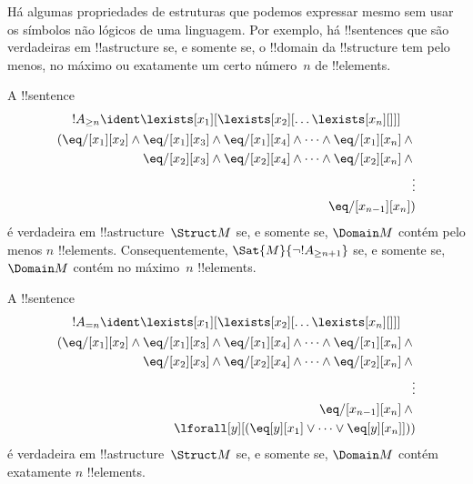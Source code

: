 \documentclass[../../../include/open-logic-section]{subfiles}
\begin{document}


\begin{explain}
Há algumas propriedades de estruturas que podemos expressar mesmo sem
usar os símbolos não lógicos de uma linguagem.  Por exemplo, há
!!{sentence}s que são verdadeiras em !!a{structure} se, e somente se, o
!!{domain} da !!{structure} tem pelo menos, no máximo ou exatamente um
certo número~$n$ de !!{element}s.
\end{explain}

\begin{prop}
A !!{sentence}
\begin{multline*}
  !A_{\ge n} \ident \lexists[x_1][\lexists[x_2][\dots\lexists[x_n][{}]]]\\
  \begin{aligned}
  (\eq/[x_1][x_2] \land {}
  \eq/[x_1][x_3] \land \eq/[x_1][x_4] \land \dots \land \eq/[x_1][x_n] \land {}\\
\eq/[x_2][x_3] \land \eq/[x_2][x_4] \land \dots \land {} \eq/[x_2][x_n] \land {} \\
\vdots\\
\eq/[x_{n-1}][x_n])
\end{aligned}
\end{multline*}
é verdadeira em !!a{structure}~$\Struct M$ se, e somente se, $\Domain M$
contém pelo menos $n$ !!{element}s. Consequentemente,
$\Sat{M}{\lnot !A_{\ge n+1}}$ se, e somente se, $\Domain M$ contém no
máximo~$n$ !!{element}s.

\end{prop}

\begin{prop}
A !!{sentence}
\begin{multline*}
!A_{= n} \ident \lexists[x_1][\lexists[x_2][\dots\lexists[x_n][{}]]] \\
\begin{aligned}
  (\eq/[x_1][x_2] \land {}
  \eq/[x_1][x_3] \land \eq/[x_1][x_4] \land \dots \land \eq/[x_1][x_n] \land {}\\
\eq/[x_2][x_3] \land \eq/[x_2][x_4] \land \dots \land {} \eq/[x_2][x_n] \land {} \\
\vdots\\
\eq/[x_{n-1}][x_n] \land {} \\
\lforall[y][(\eq[y][x_1] \lor \dots \lor \eq[y][x_n]]))
\end{aligned}
\end{multline*}
é verdadeira em !!a{structure}~$\Struct M$ se, e somente se, $\Domain M$
contém exatamente $n$ !!{element}s.
\end{prop}
\end{document}
